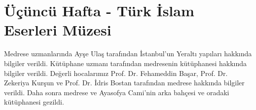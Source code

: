 \section{Üçüncü Hafta  - Türk İslam Eserleri Müzesi}
\indent\indent Medrese uzmanlarında Ayşe Ulaş tarafından İstanbul’un Yeraltı yapıları hakkında bilgiler verildi. Kütüphane uzmanı tarafından medresenin kütüphanesi hakkında bilgiler verildi. Değerli hocalarımız Prof. Dr. Fehameddin Başar, Prof. Dr. Zekeriya Kurşun ve Prof. Dr. İdris Bostan tarafından medrese hakkında bilgiler verildi. Daha sonra medrese ve Ayasofya Cami’nin arka bahçesi ve oradaki kütüphanesi gezildi.  
